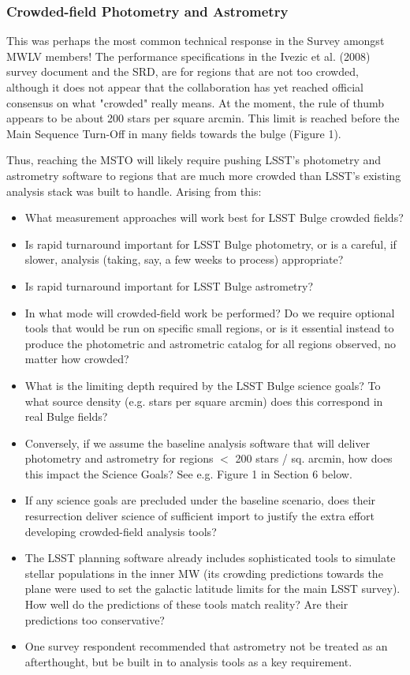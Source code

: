 \subsubsection{Crowded-field Photometry and Astrometry}
 This was perhaps the most common technical response in the Survey amongst MWLV members! 
The performance specifications in the Ivezic et al. (2008) survey document and the SRD, are for regions that are not too crowded, although it does not appear that 
the collaboration has yet reached official consensus on what "crowded" really means. At the moment, the rule of thumb appears to be 
about 200 stars per square arcmin. 
This limit is reached before the Main Sequence Turn-Off in many fields 
towards the bulge (Figure 1).
 
Thus, reaching the MSTO will likely require pushing LSST's photometry and 
astrometry software to regions that are much more crowded than LSST’s existing analysis stack was built to handle. Arising from this: 
\begin{itemize}
\item What measurement approaches will work best for LSST Bulge crowded fields? 
\item{Is rapid turnaround important for LSST Bulge photometry, or is a careful, if slower, analysis (taking, say, 
a few weeks to process) appropriate? }
\item Is rapid turnaround important for LSST Bulge astrometry? 
\item{In what mode will crowded-field work be performed? Do we require optional tools that would be run on 
specific small regions, or is it essential instead to produce the photometric and astrometric catalog for 
all regions observed, no matter how crowded? }
\item{What is the limiting depth required by the LSST Bulge science goals? To what source density (e.g. stars 
per square arcmin) does this correspond in real Bulge fields? }
\item{Conversely, if we assume the baseline analysis software that will deliver photometry and astrometry for 
regions $<$ 200 stars / sq. arcmin, how does this impact the Science Goals? See e.g. Figure 1 in Section 6 
below.}
\item{If any science goals are precluded under the baseline scenario, does their resurrection deliver science of 
sufficient import to justify the extra effort developing crowded-field analysis tools? }
\item{
The LSST planning software already includes sophisticated tools to simulate stellar populations in the 
inner MW (its crowding predictions towards the plane were used to set the galactic latitude limits for the main LSST survey). How well do the predictions of these tools match reality? Are their predictions too conservative? }
\item{One survey respondent recommended that astrometry not be treated as an afterthought, but be built in to analysis tools as a key requirement. }
\end{itemize}

